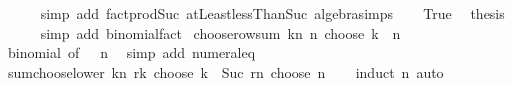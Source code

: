 \begin{isabellebody}
\ \ \ \ \isamarkupfalse%
\ {\isacharparenleft}{\kern0pt}simp\ add{\isacharcolon}{\kern0pt}\ fact{\isacharunderscore}{\kern0pt}prod{\isacharunderscore}{\kern0pt}Suc\ atLeast{}{\isacharunderscore}{\kern0pt}lessThan{\isacharunderscore}{\kern0pt}Suc\ algebra{\isacharunderscore}{\kern0pt}simps{\isacharparenright}{\kern0pt}\isanewline
\ \ \isamarkupfalse%
\ True\ \isamarkupfalse%
\ {\isacharquery}{\kern0pt}thesis\isanewline
\ \ \ \ \isamarkupfalse%
\ {\isacharparenleft}{\kern0pt}simp\ add{\isacharcolon}{\kern0pt}\ binomial{\isacharunderscore}{\kern0pt}fact{\isacharprime}{\kern0pt}{\isacharparenright}{\kern0pt}\isanewline
{}\isamarkupfalse%
%
\endisatagproof
{\isafoldproof}%
%
\isadelimproof
\isanewline
%
\endisadelimproof
\isanewline
{}\isamarkupfalse%
\ choose{\isacharunderscore}{\kern0pt}row{\isacharunderscore}{\kern0pt}sum{\isacharcolon}{\kern0pt}\ {\isachardoublequoteopen}{\isacharparenleft}{\kern0pt}{\isasymSum}k{\isasymle}n{\isachardot}{\kern0pt}\ n\ choose\ k{\isacharparenright}{\kern0pt}\ {\isacharequal}{\kern0pt}\ {}{\isacharcircum}{\kern0pt}n{\isachardoublequoteclose}\isanewline
%
\isadelimproof
\ \ %
\endisadelimproof
%
\isatagproof
{}\isamarkupfalse%
\ binomial\ {\isacharbrackleft}{\kern0pt}of\ {}\ {\isachardoublequoteopen}{}{\isachardoublequoteclose}\ n{\isacharbrackright}{\kern0pt}\ \isamarkupfalse%
\ {\isacharparenleft}{\kern0pt}simp\ add{\isacharcolon}{\kern0pt}\ numeral{\isacharunderscore}{\kern0pt}{}{\isacharunderscore}{\kern0pt}eq{\isacharunderscore}{\kern0pt}{}{\isacharparenright}{\kern0pt}%
\endisatagproof
{\isafoldproof}%
%
\isadelimproof
\isanewline
%
\endisadelimproof
\isanewline
{}\isamarkupfalse%
\ sum{\isacharunderscore}{\kern0pt}choose{\isacharunderscore}{\kern0pt}lower{\isacharcolon}{\kern0pt}\ {\isachardoublequoteopen}{\isacharparenleft}{\kern0pt}{\isasymSum}k{\isasymle}n{\isachardot}{\kern0pt}\ {\isacharparenleft}{\kern0pt}r{\isacharplus}{\kern0pt}k{\isacharparenright}{\kern0pt}\ choose\ k{\isacharparenright}{\kern0pt}\ {\isacharequal}{\kern0pt}\ Suc\ {\isacharparenleft}{\kern0pt}r{\isacharplus}{\kern0pt}n{\isacharparenright}{\kern0pt}\ choose\ n{\isachardoublequoteclose}\isanewline
%
\isadelimproof
\ \ %
\endisadelimproof
%
\isatagproof
{}\isamarkupfalse%
\ {\isacharparenleft}{\kern0pt}induct\ n{\isacharparenright}{\kern0pt}\ auto%
\endisatagproof
{\isafoldproof}%
%
\isadelimproof
\isanewline
%
\endisadelimproof

\end{isabellebody}
